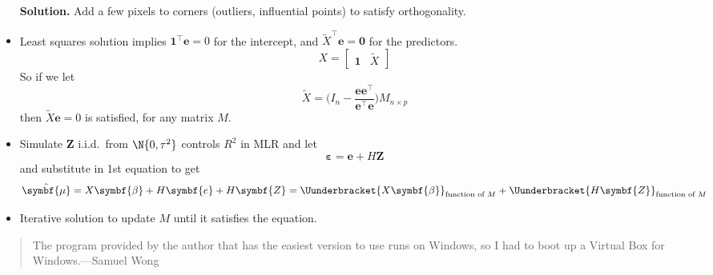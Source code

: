 \begin{itemize}
          \textbf{Solution.} Add a few pixels to corners (outliers,
          influential points) to satisfy orthogonality.
    \item Least squares solution implies $ \symbf{1}^\top \symbf{e}=0 $
          for the intercept,
          and $ \tilde{X}^\top \symbf{e}=\symbf{0} $ for the predictors.
          \[ X=\begin{bmatrix}
                  \symbf{1} & \tilde{X}
              \end{bmatrix} \]
          So if we let
          \[ \tilde{X}=\biggl(I_n-\frac{\symbf{e}\symbf{e}^\top}{\symbf{e}^\top \symbf{e}} \biggr)M_{n\times p} \]
          then $ \tilde{X} \symbf{e}=0 $ is satisfied, for any matrix $ M $.
    \item Simulate $ \symbf{Z} $ i.i.d.\ from $ \N{0,\tau^2} $
          controls $ R^2 $ in MLR and let
          \[ \symbf{\varepsilon}=\symbf{e}+H \symbf{Z} \]
          and substitute in 1st equation to get
          \[ \hat{\symbf{\mu}}=X \symbf{\beta}+H\symbf{e}+H\symbf{Z}=
              \Uunderbracket{X \symbf{\beta}}_{\text{function of }M}+\Uunderbracket{H\symbf{Z}}_{\text{function of }M} \]
    \item Iterative solution to update $ M $ until it satisfies the equation.
\end{itemize}
\begin{quote}
    The program provided by the author that has the easiest version to use
    runs on Windows, so I had to boot up a Virtual Box for Windows.---Samuel Wong
\end{quote}
